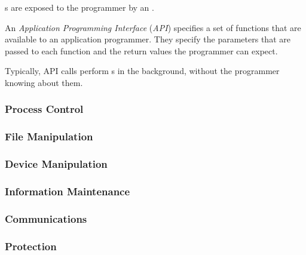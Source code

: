 s are exposed to the programmer by an .
\begin{definition}\label{def:API}
  An \emph{Application Programming Interface} (\emph{API}) specifies a set of functions that are available to an application programmer.
  They specify the parameters that are passed to each function and the return values the programmer can expect.

  Typically, API calls perform s in the background, without the programmer knowing about them.
\end{definition}

\subsubsection{Process Control}\label{subsubsec:Process_Control}
\subsubsection{File Manipulation}\label{subsubsec:File_Manipulation}
\subsubsection{Device Manipulation}\label{subsubsec:Device_Manipulation}
\subsubsection{Information Maintenance}\label{subsubsec:Information_Maintenance}
\subsubsection{Communications}\label{subsubsec:Communications}
\subsubsection{Protection}\label{subsubsec:Protection}

